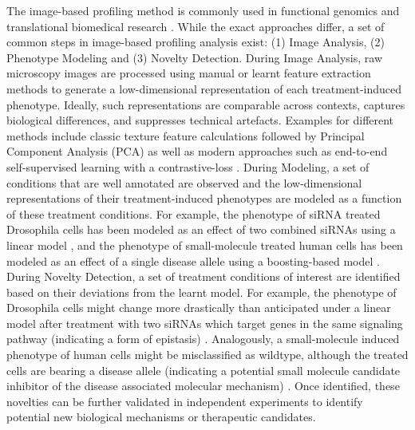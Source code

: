 \begin{flushleft}
The image-based profiling method is commonly used in functional genomics \parencite{lauferMappingGeneticInteractions2013, billmannGeneticInteractionMap2016} and translational biomedical research \parencite{gibsonStrategyIdentifyingRepurposed2015, moshkovPredictingCompoundActivity2023}. While the exact approaches differ, a set of common steps in image-based profiling analysis exist: (1) Image Analysis, (2) Phenotype Modeling and (3) Novelty Detection. During Image Analysis, raw microscopy images are processed using manual or learnt feature extraction methods to generate a low-dimensional representation of each treatment-induced phenotype. Ideally, such representations are comparable across contexts, captures biological differences, and suppresses technical artefacts. Examples for different methods include classic texture feature calculations followed by Principal Component Analysis (PCA) \parencite{caicedoDataanalysisStrategiesImagebased2017} as well as modern approaches such as end-to-end self-supervised learning with a contrastive-loss \parencite{perakisContrastiveLearningSingleCell2021}. During Modeling, a set of conditions that are well annotated are observed and the low-dimensional representations of their treatment-induced phenotypes are modeled as a function of these treatment conditions. For example, the phenotype of siRNA treated Drosophila cells has been modeled as an effect of two combined siRNAs using a linear model \parencite{billmannGeneticInteractionMap2016}, and the phenotype of small-molecule treated human cells has been modeled as an effect of a single disease allele using a boosting-based model \parencite{gibsonStrategyIdentifyingRepurposed2015}. During Novelty Detection, a set of treatment conditions of interest are identified based on their deviations from the learnt model. For example, the phenotype of Drosophila cells might change more drastically than anticipated under a linear model after treatment with two siRNAs which target genes in the same signaling pathway (indicating a form of epistasis) \parencite{billmannGeneticInteractionMap2016}. Analogously, a small-molecule induced phenotype of human cells might be misclassified as wildtype, although the treated cells are bearing a disease allele (indicating a potential small molecule candidate inhibitor of the disease associated molecular mechanism) \parencite{gibsonStrategyIdentifyingRepurposed2015}. Once identified, these novelties can be further validated in independent experiments to identify potential new biological mechanisms or therapeutic candidates.
\par


\end{flushleft}
